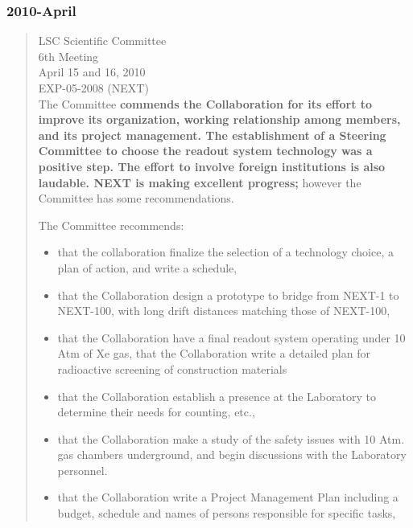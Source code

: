 \subsubsection*{2010-April}
\begin{quotation}
LSC Scientific Committee\\
6th Meeting\\
April 15 and 16, 2010\\
EXP-05-2008 (NEXT)\\

The   Committee   {\bf commends   the   Collaboration   for   its   effort   to   improve   its organization, working relationship among members, and its project management. The establishment of a Steering Committee to choose the readout system technology was a positive step. The effort to involve foreign institutions is also laudable. NEXT is making excellent progress;} however the Committee has some recommendations.

The Committee recommends:
\begin{itemize}
\item that the collaboration finalize the selection of a technology choice, a plan of action, and write a schedule,
\item  that the Collaboration design a prototype to bridge from NEXT-1 to NEXT-100, with long drift distances matching those of NEXT-100,
\item that the Collaboration have a final readout system operating under 10 Atm of Xe gas,
that  the  Collaboration  write  a  detailed  plan  for  radioactive  screening  of construction materials
\item  that the Collaboration establish a presence at the Laboratory to determine their needs for counting, etc.,
\item that  the  Collaboration make a study  of  the safety  issues  with  10  Atm.  gas chambers underground, and begin discussions with the Laboratory personnel.
\item that the Collaboration write a Project Management Plan including a budget, schedule and names of persons responsible for specific tasks,
\end{itemize}
\end{quotation}

